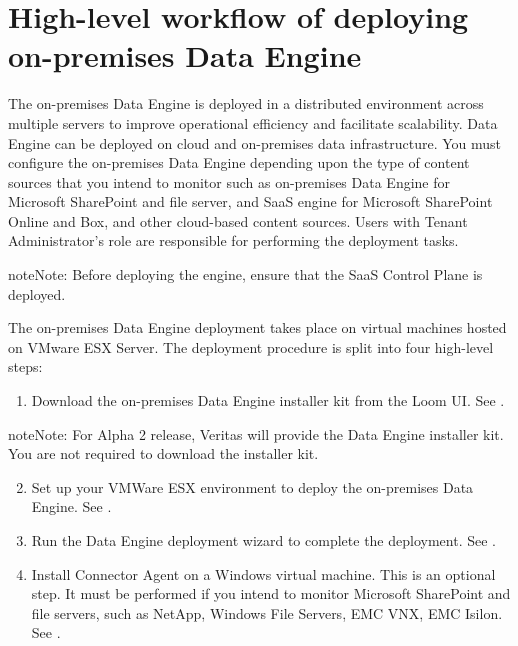 \documentclass[letterpaper,10pt,english]{sphinxmanual}
\begin{document}
\chapter{High-level workflow of deploying on-premises Data Engine}
\label{\detokenize{on_prem_dp_install_mcdmp:high-level-workflow-of-deploying-on-premises-data-engine}}
The on-premises Data Engine is deployed in a distributed environment across multiple servers to improve operational efficiency and facilitate scalability. Data
Engine can be deployed on cloud and on-premises data infrastructure. You must configure the on-premises Data Engine depending upon the type of content sources
that you intend to monitor such as on-premises Data Engine for Microsoft SharePoint and file server, and SaaS engine for Microsoft SharePoint Online and Box, and
other cloud-based content sources. Users with Tenant Administrator’s role are responsible for performing the deployment tasks.

\begin{sphinxadmonition}{note}{Note:}
Before deploying the engine, ensure that the SaaS Control Plane is deployed.
\end{sphinxadmonition}

The on-premises Data Engine deployment takes place on virtual machines hosted on VMware ESX Server. The deployment procedure is split into four high-level
steps:
\begin{enumerate}
\item {} 
Download the on-premises Data Engine installer kit from the Loom UI. See {\hyperref[\detokenize{on_prem_dp_install_mcdmp:download-install-kit}]{}}.

\end{enumerate}

\begin{sphinxadmonition}{note}{Note:}
For Alpha 2 release, Veritas will provide the Data Engine installer kit. You are not required to download the installer kit.
\end{sphinxadmonition}
\begin{enumerate}
\setcounter{enumi}{1}
\item {} 
Set up your VMWare ESX environment to deploy the on-premises Data Engine. See {\hyperref[\detokenize{on_prem_dp_install_mcdmp:set-up-vm-env}]{}}.

\item {} 
Run the Data Engine deployment wizard to complete the deployment. See {\hyperref[\detokenize{on_prem_dp_install_mcdmp:depl-dp-wizard}]{}}.

\item {} 
Install Connector Agent on a Windows virtual machine. This is an optional step. It must be performed if you intend to monitor Microsoft SharePoint and file
servers, such as NetApp, Windows File Servers, EMC VNX, EMC Isilon.  See {\hyperref[\detokenize{on_prem_dp_install_mcdmp:install-dp-agent}]{}}.

\end{enumerate}
\end{document}

